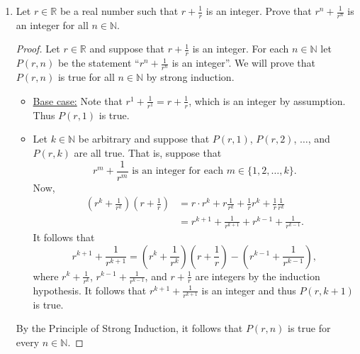 \documentclass[11pt]{article}
\def\naturals{\mathbb{N}}
\def\reals{\mathbb{R}}
\begin{document}
\begin{enumerate}
\begin{Solution}
\begin{proof}
\begin{itemize}
Now $a_{k+1} = \sqrt{2 + a_k}$. It follows from the induction hypothesis that  
\[
 \sqrt{2 +\sqrt{2}}\leq\sqrt{2 + a_k} <\sqrt{2 + 2}
\]
and thus 
\[
 \sqrt{2}<\sqrt{2 +\sqrt{2}}\leq a_{k+1} < \sqrt{4} = 2,
\]
which proves that $P(k+1)$ holds.
  \end{itemize}
It follows from the Principle of Mathematical Induction that $\sqrt{2}\leq a_n< 2$ holds for every $n\in\naturals$.
 \end{proof}
\end{Solution}

\item Let $r\in\reals$ be a real number such that $r+\frac{1}{r}$ is an integer. Prove that $r^n + \frac{1}{r^n}$ is an integer for all $n\in\naturals$.

\begin{Solution}
  \begin{proof}
  Let $r\in\reals$ and suppose that $r+\frac{1}{r}$ is an integer. 
  For each $n\in\naturals$ let $P(r,n)$ be the statement ``$r^n + \frac{1}{r^n}$ is an integer''. We will prove that $P(r,n)$ is true for all $n\in\naturals$ by strong induction.
  \begin{itemize}
   \item \underline{Base case:} Note that $r^1+ \frac{1}{r^1} = r+\frac{1}{r}$, which is an integer by assumption. Thus $P(r,1)$ is true. 
\item \underline{} Let $k\in\naturals$ be arbitrary and suppose that $P(r,1)$, $P(r,2)$, $\dots$, and $P(r,k)$ are all true. That is, suppose that 
\[
 r^m + \frac{1}{r^m} \text{ is an integer for each }m\in\{1,2,\dots,k\}. \tag{IH}
\]
Now, 
\begin{align*}
 \left(r^k + \frac{1}{r^k}\right) \left(r + \frac{1}{r}\right) &= r\cdot r^{k} + r\frac{1}{r^{k}} + \frac{1}{r}r^k + \frac{1}{r}\frac{1}{r^{k}} \\&= r^{k+1} + \frac{1}{r^{k+1}} + r^{k-1} + \frac{1}{r^{k-1}}.
\end{align*}
It follows that
\[
 r^{k+1} + \frac{1}{r^{k+1}} =  \left(r^k + \frac{1}{r^k}\right) \left(r + \frac{1}{r}\right) - \left(r^{k-1} + \frac{1}{r^{k-1}}\right),
\]
 where $r^k + \frac{1}{r^k}$, $r^{k-1} + \frac{1}{r^{k-1}}$, and $r + \frac{1}{r}$ are integers by the induction hypothesis. It follows that $r^{k+1} + \frac{1}{r^{k+1}}$ is an integer and thus $P(r,k+1)$ is true.
  \end{itemize}
By the Principle of Strong Induction, it follows that $P(r,n)$ is true for every $n\in\naturals$.
 \end{proof}
\end{Solution}



\end{enumerate}
\end{document}
